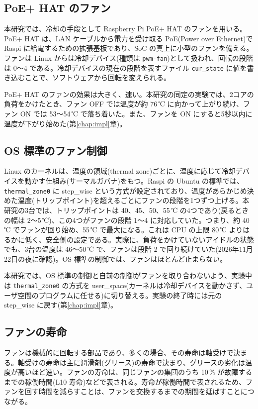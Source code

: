 \subsection{PoE+ HAT のファン}
本研究では、冷却の手段として Raspberry Pi PoE+ HAT のファンを用いる。PoE+ HAT は、LAN ケーブルから電力を受け取る PoE(Power over Ethernet)で Raspi に給電するための拡張基板であり、SoC の真上に小型のファンを備える。ファンは Linux からは冷却デバイス(種類は \texttt{pwm-fan})として扱われ、回転の段階は 0〜4 である。冷却デバイスの現在の段階を表すファイル \texttt{cur\_state} に値を書き込むことで、ソフトウェアから回転を変えられる。

PoE+ HAT のファンの効果は大きく、速い。本研究の同定の実験では、2コアの負荷をかけたとき、ファン OFF では温度が約 76\,℃ に向かって上がり続け、ファン ON では 53〜54\,℃ で落ち着いた。また、ファンを ON にすると5秒以内に温度が下がり始めた(第\ref{chap:impl}章)。

\subsection{OS 標準のファン制御}
Linux のカーネルは、温度の領域(thermal zone)ごとに、温度に応じて冷却デバイスを動かす仕組み(サーマルガバナ)をもつ。Raspi の Ubuntu の標準では、\texttt{thermal\_zone0} に step\_wise という方式が設定されており、温度があらかじめ決めた温度(トリップポイント)を超えるごとにファンの段階を1つずつ上げる。本研究の3台では、トリップポイントは 40、45、50、55\,℃ の4つであり(戻るときの幅は 2〜5\,℃)、この4つがファンの段階 1〜4 に対応していた。つまり、約 40\,℃ でファンが回り始め、55\,℃ で最大になる。これは CPU の上限 80\,℃ よりはるかに低く、安全側の設定である。実際に、負荷をかけていないアイドルの状態でも、3台の温度は 46〜50\,℃ で、ファンは段階 2 で回り続けていた(2026年11月22日の夜に確認)。OS 標準の制御では、ファンはほとんど止まらない。

本研究では、OS 標準の制御と自前の制御がファンを取り合わないよう、実験中は \texttt{thermal\_zone0} の方式を user\_space(カーネルは冷却デバイスを動かさず、ユーザ空間のプログラムに任せる)に切り替える。実験の終了時には元の step\_wise に戻す(第\ref{chap:impl}章)。

\subsection{ファンの寿命}
ファンは機械的に回転する部品であり、多くの場合、その寿命は軸受けで決まる。軸受けの寿命は主に潤滑剤(グリース)の寿命で決まり、グリースの劣化は温度が高いほど速い\cite{kim1996fanlife}。ファンの寿命は、同じファンの集団のうち 10\,\% が故障するまでの稼働時間(L10 寿命)などで表される\cite{kim1996fanlife}。寿命が稼働時間で表されるため、ファンを回す時間を減らすことは、ファンを交換するまでの期間を延ばすことにつながる。

